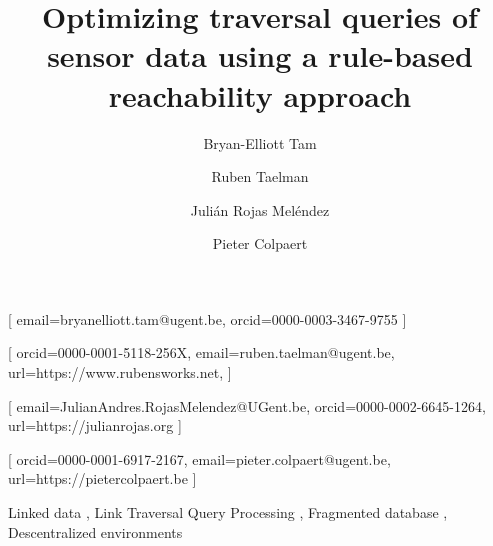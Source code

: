 \documentclass[
]{ceurart}
\begin{document}


\title{Optimizing traversal queries of sensor data using a rule-based reachability approach}


\author[1]{Bryan-Elliott Tam}[%
email=bryanelliott.tam@ugent.be,
orcid=0000-0003-3467-9755
]
\cormark[1]

\author[1]{Ruben Taelman}[%
orcid=0000-0001-5118-256X,
email=ruben.taelman@ugent.be,
url=https://www.rubensworks.net,
]
\author[1]{Julián {Rojas Meléndez}}[%
email=JulianAndres.RojasMelendez@UGent.be,
orcid=0000-0002-6645-1264,
url=https://julianrojas.org
]
\author[1]{Pieter Colpaert}[%
orcid=0000-0001-6917-2167,
email=pieter.colpaert@ugent.be,
url=https://pietercolpaert.be
]


\address[1]{IDLab,
Department of Electronics and Information Systems, Ghent University – imec}

\begin{keywords}
  Linked data \sep
  Link Traversal Query Processing \sep
  Fragmented database \sep
  Descentralized environments
\end{keywords}

\maketitle








\end{document}
